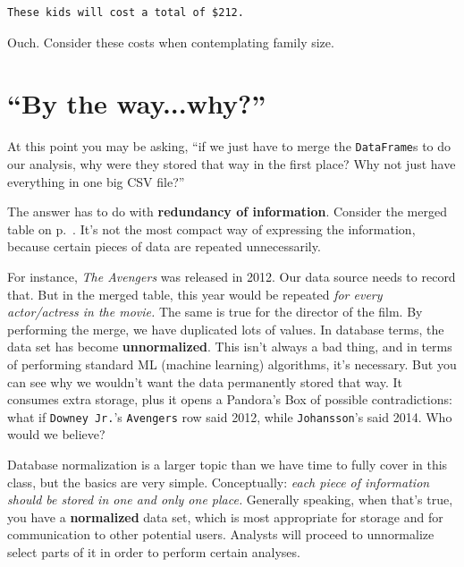 \begin{Verbatim}[fontsize=\small,samepage=true,frame=leftline,framesep=5mm,framerule=1mm]
These kids will cost a total of $212.
\end{Verbatim}

Ouch. Consider these costs when contemplating family size.


\section{``By the way...why?''}

At this point you may be asking, ``if we just have to merge the
\texttt{DataFrame}s to do our analysis, why were they stored that way in the
first place? Why not just have everything in one big CSV file?''


The answer has to do with \textbf{redundancy of information}. Consider the
merged table on p.~\pageref{roles_movies}. It's not the most compact way of
expressing the information, because certain pieces of data are repeated
unnecessarily.


For instance, \textit{The Avengers} was released in 2012. Our data source
needs to record that. But in the merged table, this year would be repeated
\textit{for every actor/actress in the movie.} The same is true for the
director of the film. By performing the merge, we have duplicated lots of
values. In database terms, the data set has become \textbf{unnormalized}. This
isn't always a bad thing, and in terms of performing standard ML (machine
learning) algorithms, it's necessary. But you can see why we wouldn't want the
data permanently stored that way. It consumes extra storage, plus it opens a
Pandora's Box of possible contradictions: what if \texttt{Downey Jr.}'s
\texttt{Avengers} row said 2012, while \texttt{Johansson}'s said 2014. Who
would we believe?

\label{normalized}

Database normalization is a larger topic than we have time to fully cover in
this class, but the basics are very simple. Conceptually: \textit{each piece
of information should be stored in one and only one place.} Generally
speaking, when that's true, you have a \textbf{normalized} data set, which is
most appropriate for storage and for communication to other potential users.
Analysts will proceed to unnormalize select parts of it in order to perform
certain analyses.

